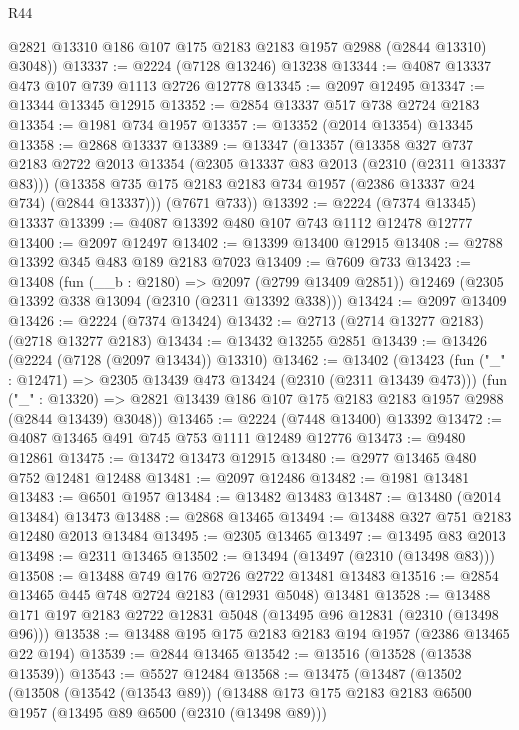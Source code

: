 \begin{lexlean}{R44}
\begin{coremodule}
      @2821 @13310 @186 @107 @175 @2183 @2183 @1957 @2988 (@2844 @13310) @3048))
@13337 := @2224 (@7128 @13246) @13238
@13344 := @4087 @13337 @473 @107 @739 @1113 @2726 @12778
@13345 := @2097 @12495
@13347 := @13344 @13345 @12915
@13352 := @2854 @13337 @517 @738 @2724 @2183
@13354 := @1981 @734 @1957
@13357 := @13352 (@2014 @13354) @13345
@13358 := @2868 @13337
@13389 := @13347
    (@13357
      (@13358
        @327
        @737
        @2183
        @2722
        @2013
        @13354
        (@2305 @13337 @83 @2013 (@2310 (@2311 @13337 @83)))
        (@13358 @735 @175 @2183 @2183 @734 @1957 (@2386 @13337 @24 @734) (@2844 @13337)))
      (@7671 @733))
@13392 := @2224 (@7374 @13345) @13337
@13399 := @4087 @13392 @480 @107 @743 @1112 @12478 @12777
@13400 := @2097 @12497
@13402 := @13399 @13400 @12915
@13408 := @2788 @13392 @345 @483 @189 @2183 @7023
@13409 := @7609 @733
@13423 := @13408
    (fun (__b : @2180) => @2097 (@2799 @13409 @2851))
    @12469
    (@2305 @13392 @338 @13094 (@2310 (@2311 @13392 @338)))
@13424 := @2097 @13409
@13426 := @2224 (@7374 @13424)
@13432 := @2713 (@2714 @13277 @2183) (@2718 @13277 @2183)
@13434 := @13432 @13255 @2851
@13439 := @13426 (@2224 (@7128 (@2097 @13434)) @13310)
@13462 := @13402
    (@13423
      (fun ("_" : @12471) => @2305 @13439 @473 @13424 (@2310 (@2311 @13439 @473)))
      (fun ("_" : @13320) =>
      @2821 @13439 @186 @107 @175 @2183 @2183 @1957 @2988 (@2844 @13439) @3048))
@13465 := @2224 (@7448 @13400) @13392
@13472 := @4087 @13465 @491 @745 @753 @1111 @12489 @12776
@13473 := @9480 @12861
@13475 := @13472 @13473 @12915
@13480 := @2977 @13465 @480 @752 @12481 @12488
@13481 := @2097 @12486
@13482 := @1981 @13481
@13483 := @6501 @1957
@13484 := @13482 @13483
@13487 := @13480 (@2014 @13484) @13473
@13488 := @2868 @13465
@13494 := @13488 @327 @751 @2183 @12480 @2013 @13484
@13495 := @2305 @13465
@13497 := @13495 @83 @2013
@13498 := @2311 @13465
@13502 := @13494 (@13497 (@2310 (@13498 @83)))
@13508 := @13488 @749 @176 @2726 @2722 @13481 @13483
@13516 := @2854 @13465 @445 @748 @2724 @2183 (@12931 @5048) @13481
@13528 := @13488 @171 @197 @2183 @2722 @12831 @5048 (@13495 @96 @12831 (@2310 (@13498 @96)))
@13538 := @13488 @195 @175 @2183 @2183 @194 @1957 (@2386 @13465 @22 @194)
@13539 := @2844 @13465
@13542 := @13516 (@13528 (@13538 @13539))
@13543 := @5527 @12484
@13568 := @13475
    (@13487
      (@13502
        (@13508
          (@13542 (@13543 @89))
          (@13488
            @173
            @175
            @2183
            @2183
            @6500
            @1957
            (@13495 @89 @6500 (@2310 (@13498 @89)))

\end{coremodule}
\end{lexlean}

